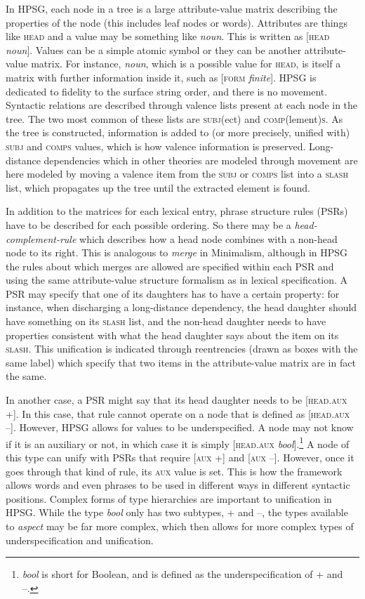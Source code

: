 In HPSG, each node in a tree is a large attribute-value matrix describing the properties of the node (this includes leaf nodes or words). Attributes are things like \textsc{head} and a value may be something like \textit{noun}. This is written as [\textsc{head} \textit{noun}]. Values can be a simple atomic symbol or they can be another attribute-value matrix. For instance, \textit{noun}, which is a possible value for \textsc{head}, is itself a matrix with further information inside it, such as [\textsc{form} \textit{finite}]. HPSG is dedicated to fidelity to the surface string order, and there is no movement. Syntactic relations are described through valence lists present at each node in the tree. The two most common of these lists are \textsc{subj}(ect) and \textsc{comp}(lement)\textsc{s}. As the tree is constructed, information is added to (or more precisely, unified with) \textsc{subj} and \textsc{comps} values, which is how valence information is preserved. Long-distance dependencies which in other theories are modeled through movement are here modeled by moving a valence item from the \textsc{subj} or \textsc{comps} list into a \textsc{slash} list, which propagates up the tree until the extracted element is found.

In addition to the matrices for each lexical entry, phrase structure rules (PSRs) have to be described for each possible ordering. So there may be a {\textit{head-complement-rule}} which describes how a head node combines with a non-head node to its right. This is analogous to \textit{merge} in Minimalism, although in HPSG the rules about which merges are allowed are specified within each PSR and using the same attribute-value structure formalism as in lexical specification. A PSR may specify that one of its daughters has to have a certain property: for instance, when discharging a long-distance dependency, the head daughter should have something on its \textsc{slash} list, and the non-head daughter needs to have properties consistent with what the head daughter says about the item on its \textsc{slash}. This unification is indicated through reentrencies (drawn as boxes with the same label) which specify that two items in the attribute-value matrix are in fact the same.

In another case, a PSR might say that its head daughter needs to be [\textsc{head.aux} +]. In this case, that rule cannot operate on a node that is defined as [\textsc{head.aux} --]. However, HPSG allows for values to be underspecified. A node may not know if it is an auxiliary or not, in which case it is simply [\textsc{head.aux} \textit{bool}].\footnote{\textit{bool} is short for Boolean, and is defined as the underspecification of + and --.} A node of this type can unify with PSRs that require [\textsc{aux} +] and [\textsc{aux} --]. However, once it goes through that kind of rule, its \textsc{aux} value is set. This is how the framework allows words and even phrases to be used in different ways in different syntactic positions. Complex forms of type hierarchies are important to unification in HPSG. While the type \textit{bool} only has two subtypes, + and --, the types available to \textit{aspect} may be far more complex, which then allows for more complex types of underspecification and unification.

